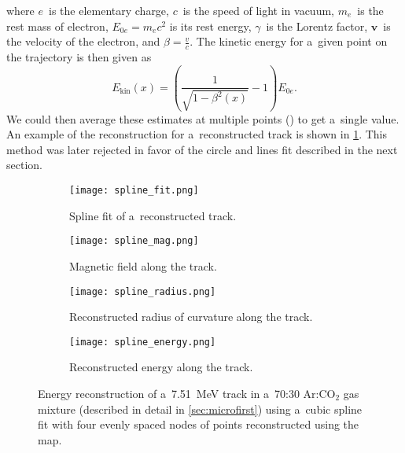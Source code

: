 		where $e$~is the elementary charge, $c$~is the speed of light in vacuum, $m_e$~is the rest mass of electron, $E_{0e} = m_e c^2$ is its rest energy, $\gamma$~is the Lorentz factor, $\mathbf{v}$~is the velocity of the electron, and $\beta = \frac{v}{c}$. The kinetic energy for a~given point on the trajectory is then given as
			\begin{equation}
				\label{eq:ekin2}
				E_\text{kin}(x) = \left(\frac{1}{\sqrt{1-\beta^2(x)}}-1\right)E_{0e}.
			\end{equation}
		We could then average these estimates at multiple points () to get a~single value. An example of the reconstruction for a~reconstructed track is shown in \cref{fig:spline}. This method was later rejected in favor of the circle and lines fit described in the next section.
		
		\begin{figure}
			\centering
			\begin{subfigure}[t]{0.48\textwidth}
				\centering
				\texttt{[image: spline\_fit.png]}
				\caption{Spline fit of a~reconstructed track.}
			\end{subfigure}
			\hfill
			\begin{subfigure}[t]{0.48\textwidth}
				\centering
				\texttt{[image: spline\_mag.png]}
				\caption{Magnetic field along the track.}
			\end{subfigure}
			\begin{subfigure}[t]{0.48\textwidth}
				\centering
				\texttt{[image: spline\_radius.png]}
				\caption{Reconstructed radius of curvature along the track.}
			\end{subfigure}
			\hfill
			\begin{subfigure}[t]{0.48\textwidth}
				\centering
				\texttt{[image: spline\_energy.png]}
				\caption{Reconstructed energy along the track.}
			\end{subfigure}
			\caption{Energy reconstruction of a~\qty{7.51}{\MeV} track in a~70:30 Ar:CO$_2$ gas mixture (described in detail in \cref{sec:microfirst}) using a~cubic spline fit with four evenly spaced nodes of points reconstructed using the map.}
			\label{fig:spline}
		\end{figure}
	
